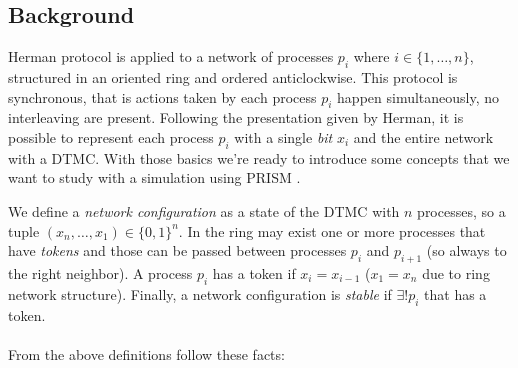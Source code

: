 \subsection{Background}

Herman protocol \cite{Her90} is applied to a network of processes
$p_i$ where $i \in \{1,\ldots, n\}$, structured in an oriented ring
and ordered anticlockwise. This protocol is synchronous, that is
actions taken by each process $p_i$ happen simultaneously, no
interleaving are present. Following the presentation given by Herman,
it is possible to represent each process $p_i$ with a single
\emph{bit} $x_i$ and the entire network with a DTMC. With those basics
we're ready to introduce some concepts that we want to study with a
simulation using PRISM \cite{KNP11}.

We define a \emph{network configuration} as a state of the DTMC with
$n$ processes, so a tuple $(x_n, \ldots, x_1) \in \{0,1\}^n$. In the
ring may exist one or more processes that have \emph{tokens} and those
can be passed between processes $p_i$ and $p_{i+1}$ (so always to the
right neighbor). A process $p_i$ has a token if $x_i = x_{i-1}$ ($x_1
= x_n$ due to ring network structure). Finally, a network
configuration is \emph{stable} if $\exists! p_i$ that has a token.
\\\\
From the above definitions follow these facts:
